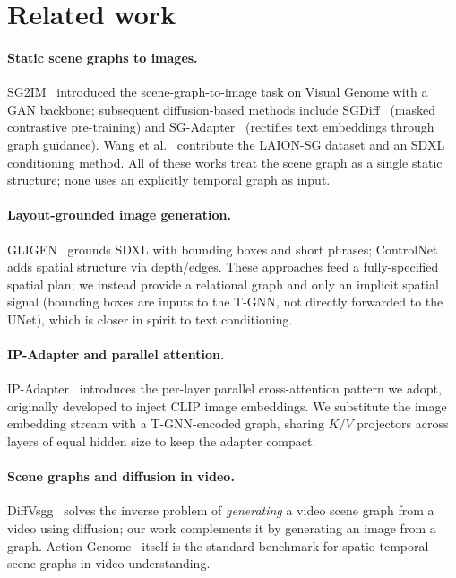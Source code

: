 \documentclass[11pt]{article}
\begin{document}
\section{Related work}
\paragraph{Static scene graphs to images.}
SG2IM~\cite{johnson2018sg2im} introduced the
scene-graph-to-image task on Visual Genome with a GAN backbone;
subsequent diffusion-based methods include SGDiff~\cite{yang2022sgdiff}
(masked contrastive pre-training) and
SG-Adapter~\cite{shen2024sgadapter} (rectifies text embeddings through
graph guidance).  Wang et al.~\cite{wang2024sgcomposer} contribute the
LAION-SG dataset and an SDXL conditioning method.  All of these works
treat the scene graph as a single static structure; none uses an
explicitly temporal graph as input.

\paragraph{Layout-grounded image generation.}
GLIGEN~\cite{li2023gligen} grounds SDXL with bounding boxes and short
phrases; ControlNet~\cite{zhang2023controlnet} adds spatial structure
via depth/edges. These approaches feed a fully-specified spatial
plan; we instead provide a relational graph and only an implicit
spatial signal (bounding boxes are inputs to the T-GNN, not directly
forwarded to the UNet), which is closer in spirit to text conditioning.

\paragraph{IP-Adapter and parallel attention.}
IP-Adapter~\cite{ye2023ipadapter} introduces the per-layer parallel
cross-attention pattern we adopt, originally developed to inject CLIP
image embeddings.  We substitute the image embedding stream with a
T-GNN-encoded graph, sharing $K/V$ projectors across layers of equal
hidden size to keep the adapter compact.

\paragraph{Scene graphs and diffusion in video.}
DiffVsgg~\cite{cheng2025diffvsgg} solves the inverse problem of
\emph{generating} a video scene graph from a video using diffusion;
our work complements it by generating an image from a graph.  Action
Genome~\cite{ji2020actiongenome} itself is the standard benchmark for
spatio-temporal scene graphs in video understanding.
\end{document}
